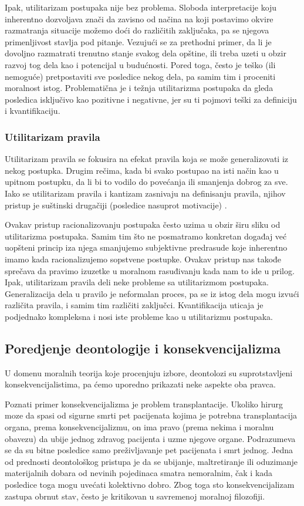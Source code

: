\documentclass[a4paper]{article}
\begin{document}
Ipak, utilitarizam postupaka nije bez problema. Sloboda interpretacije koju inherentno dozvoljava znači da zavisno od načina na koji postavimo okvire razmatranja situacije možemo doći do različitih zaključaka, pa se njegova primenljivost stavlja pod pitanje. Vezujući se za prethodni primer, da li je dovoljno razmatrati trenutno stanje svakog dela opštine, ili treba uzeti u obzir razvoj tog dela kao i potencijal u budućnosti. Pored toga, često je teško (ili nemoguće) pretpostaviti sve posledice nekog dela, pa samim tim i proceniti moralnost istog. Problematična je i težnja utilitarizma postupaka da gleda posledica isključivo kao pozitivne i negativne, jer su ti pojmovi teški za definiciju i kvantifikaciju. 

\subsubsection{Utilitarizam pravila}
Utilitarizam pravila se fokusira na efekat pravila koja se može generalizovati iz nekog postupka. Drugim rečima, kada bi svako postupao na isti način kao u upitnom postupku, da li bi to vodilo do povećanja ili smanjenja dobrog za sve. Iako se utilitarizam pravila i kantizam zasnivaju na definisanju pravila, njihov pristup je suštinski drugačiji (posledice nasuprot motivacije) \cite{quinn-ethics}. 

Ovakav pristup racionalizovanju postupaka često uzima u obzir širu sliku od utilitarizma postupaka. Samim tim što ne posmatramo konkretan događaj već uopšteni princip iza njega smanjujemo subjektivne predrasude koje inherentno imamo kada racionalizujemo sopstvene postupke. Ovakav pristup nas takođe sprečava da pravimo izuzetke u moralnom rasuđivanju kada nam to ide u prilog. 
Ipak, utilitarizam pravila deli neke probleme sa utilitarizmom postupaka. Generalizacija dela u pravilo je neformalan proces, pa se iz istog dela mogu izvući različita pravila, i samim tim različiti zaključci. Kvantifikacija uticaja je podjednako kompleksna i nosi iste probleme kao u utilitarizmu postupaka. 

\subsection{Poredjenje deontologije i konsekvencijalizma}
U domenu moralnih teorija koje procenjuju izbore, deontolozi su suprotstavljeni konsekvencijalistima, pa ćemo uporedno prikazati neke aspekte oba pravca.

Poznati primer konsekvencijalizma je problem transplantacije. Ukoliko hirurg moze da spasi od sigurne smrti pet pacijenata kojima je potrebna transplantacija organa, prema konsekvencijalizmu, on ima pravo (prema nekima i moralnu obavezu) da ubije jednog zdravog pacijenta i uzme njegove organe. Podrazumeva se da su bitne posledice samo preživljavanje pet pacijenata i smrt jednog.
Jedna od prednosti deontološkog pristupa je da se ubijanje, maltretiranje ili oduzimanje materijalnih dobara od nevinih pojedinaca smatra nemoralnim, čak i kada posledice toga mogu uvećati kolektivno dobro. Zbog toga sto konsekvencijalizam zastupa obrnut stav, često je kritikovan u savremenoj moralnoj filozofiji.
\end{document}
